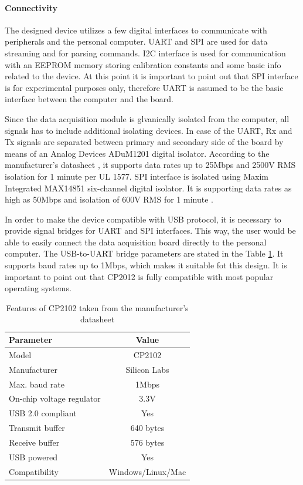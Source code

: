 \documentclass[12pt,a4paper]{article}
\begin{document}
\paragraph{Connectivity}
The designed device utilizes a few digital interfaces to communicate with peripherals and the personal computer. UART and SPI are used for data streaming and for parsing commands. I2C interface is used for communication with an EEPROM memory storing calibration constants and some basic info related to the device. At this point it is important to point out that SPI interface is for experimental purposes only, therefore UART is assumed to be the basic interface between the computer and the board.
\par
Since the data acquisition module is glvanically isolated from the computer, all signals has to include additional isolating devices. In case of the UART, Rx and Tx signals are separated between primary and secondary side of the board by means of an Analog Devices ADuM1201 digital isolator. According to the manufacturer's datasheet \cite{adum1201_params}, it supports data rates up to 25Mbps and 2500V RMS isolation for 1 minute per UL 1577. SPI interface is isolated using Maxim Integrated MAX14851 six-channel digital isolator. It is supporting data rates as high as 50Mbps and isolation of 600V RMS for 1 minute \cite{max14851_params}.
\par
In order to make the device compatible with USB protocol, it is necessary to provide signal bridges for UART and SPI interfaces. This way, the user would be able to easily connect the data acquisition board directly to the personal computer. The USB-to-UART bridge parameters are stated in the Table \ref{tab:cp2102_params}. It supports baud rates up to 1Mbps, which makes it suitable fot this design. It is important to point out that CP2012 is fully compatible with most popular operating systems.

\begin{table}[ht!]
\begin{tabular}{|l|c|}
\hline
\textbf{Parameter}	& \textbf{Value} 	\\ \hline
Model  				& CP2102       \\ \hline
Manufacturer    	& Silicon Labs	\\ \hline
Max. baud rate       	&  1Mbps 		\\ \hline
On-chip voltage regulator     &  3.3V			\\ \hline
USB 2.0 compliant        &  Yes			\\ \hline
Transmit buffer        &  640 bytes				\\ \hline
Receive buffer 		&  576 bytes		\\ \hline
USB powered 	&  Yes 		\\ \hline
Compatibility 	&  Windows/Linux/Mac  		\\ \hline
\end{tabular}
\caption{Features of CP2102 taken from the manufacturer's datasheet \cite{cp2102_params}}
\label{tab:cp2102_params}
\end{table}
\end{document}
